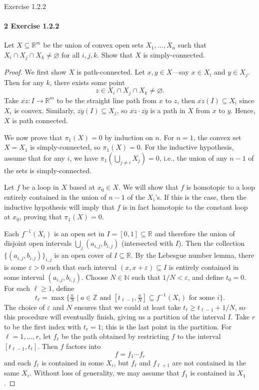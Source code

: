 \documentclass[12pt]{article}
\newlength{\myparskip}
\newenvironment{fullbox}{\begin{lrbox}{\savefullbox}\begin{minipage}{\dimexpr\textwidth-2\fboxsep\relax}\setlength{\parskip}{\myparskip}}{\end{minipage}\end{lrbox}\framebox[\textwidth]{\usebox{\savefullbox}}}
\newenvironment{pbox}[1][]{\begin{fullbox}\ifx#1\empty\else\paragraph{#1}\phantom{}\fi}{\end{fullbox}}
\theoremstyle{definition}
\newcommand{\N}{\mathbb{N}}
\newcommand{\Z}{\mathbb{Z}}
\newcommand{\R}{\mathbb{R}}
\newcommand{\eps}{\varepsilon}
\renewcommand{\emptyset}{\varnothing}
\newcommand{\<}{\langle}
\renewcommand{\>}{\rangle}
\newcommand{\seq}{\subseteq}
\newcommand{\ovl}{\overline}
\begin{document}
\begin{pbox}[2 Exercise 1.2.2]
    Let $X \seq \R^m$ be the union of convex open sets $X_1, \dots, X_n$ such that $X_i \cap X_j \cap X_k \ne \emptyset$ for all $i, j , k$.
    Show that $X$ is simply-connected.
\end{pbox}

\begin{proof}
    We first show $X$ is path-connected.
    Let $x, y \in X$---say $x \in X_i$ and $y \in X_j$.
    Then for any $k$, there exists some point
    \[
        z \in X_i \cap X_j \cap X_k \ne \emptyset.
    \]
    Take $\ovl{xz} : I \to \R^m$ to be the straight line path from $x$ to $z$, then $\ovl{xz}(I) \seq X_i$ since $X_i$ is convex.
    Similarly, $\ovl{zy}(I) \seq X_j$, so $\ovl{xz} \cdot \ovl{zy}$ is a path in $X$ from $x$ to $y$.
    Hence, $X$ is path connected.
    
    We now prove that $\pi_1(X) = 0$ by induction on $n$.
    For $n = 1$, the convex set $X = X_1$ is simply-connected, so $\pi_1(X) = 0$.
    For the inductive hypothesis, assume that for any $i$, we have $\pi_1(\bigcup_{j \ne i} X_j) = 0$, i.e., the union of any $n-1$ of the sets is simply-connected.

    Let $f$ be a loop in $X$ based at $x_0 \in X$.
    We will show that $f$ is homotopic to a loop entirely contained in the union of $n - 1$ of the $X_i$'s.
    If this is the case, then the inductive hypothesis will imply that $f$ is in fact homotopic to the constant loop at $x_0$, proving that $\pi_1(X) = 0$.

    Each $f^{-1}(X_i)$ is an open set in $I = [0, 1] \seq \R$ and therefore the union of disjoint open intervals $\bigcup_j (a_{i, j}, b_{i, j})$ (intersected with $I$).
    Then the collection $\{(a_{i, j}, b_{i, j})\}_{i, j}$ is an open cover of $I \seq \R$.
    By the Lebesgue number lemma, there is some $\eps > 0$ such that each interval $(x, x + \eps) \seq I$ is entirely contained in some interval $(a_{i, j}, b_{i, j})$.
    Choose $N \in \N$ such that $1/N < \eps$, and define $t_0 = 0$.
    For each $\ell \geq 1$, define
    \[
        t_\ell = \max \{\tfrac{a}{N} \mid a \in \Z \text{ and } [t_{\ell-1}, \tfrac{a}{N}] \seq f^{-1}(X_i) \text{ for some } i\}.
    \]
    The choice of $\eps$ and $N$ ensures that we could at least take $t_\ell \geq t_{\ell-1} + 1/N$, so this procedure will eventually finish, giving us a partition of the interval $I$.
    Take $r$ to be the first index with $t_r = 1$; this is the last point in the partition.
    For $\ell = 1, \dots, r$, let $f_\ell$ be the path obtained by restricting $f$ to the interval $[t_{\ell-1}, t_\ell]$.
    Then $f$ factors into
    \[
        f = f_1 \cdots f_r
    \]
    and each $f_\ell$ is contained in some $X_i$, but $f_\ell$ and $f_{\ell+1}$ are not contained in the same $X_i$.
    Without loss of generality, we may assume that $f_1$ is contained in $X_1$.


\end{proof}
\end{document}
